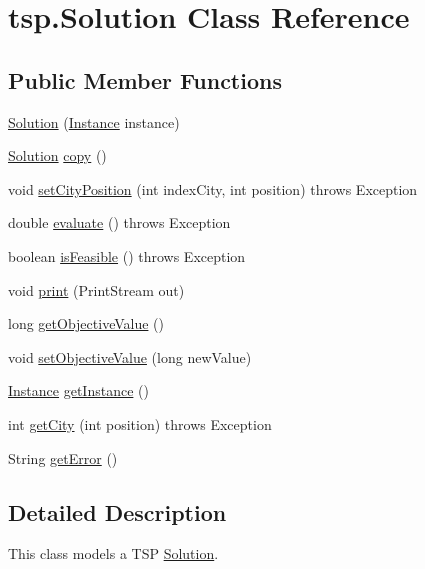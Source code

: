 \hypertarget{classtsp_1_1_solution}{}\section{tsp.\+Solution Class Reference}
\label{classtsp_1_1_solution}
\subsection*{Public Member Functions}
\begin{DoxyCompactItemize}
\item 
\mbox{\hyperlink{classtsp_1_1_solution_a1d6b0b25fa67c11755bb5f753c610fa1}{Solution}} (\mbox{\hyperlink{classtsp_1_1_instance}{Instance}} instance)
\item 
\mbox{\hyperlink{classtsp_1_1_solution}{Solution}} \mbox{\hyperlink{classtsp_1_1_solution_a8d9f2e3624443e569000155e3795bba9}{copy}} ()
\item 
void \mbox{\hyperlink{classtsp_1_1_solution_ac412146a40e865c6f0b2b8e44e4ba5e2}{set\+City\+Position}} (int index\+City, int position)  throws Exception 
\item 
double \mbox{\hyperlink{classtsp_1_1_solution_aab96d9400180cc1854a1a48b848f92a4}{evaluate}} ()  throws Exception 
\item 
boolean \mbox{\hyperlink{classtsp_1_1_solution_a93a7045acd93ccac25da9c471618f9bc}{is\+Feasible}} ()  throws Exception 
\item 
void \mbox{\hyperlink{classtsp_1_1_solution_ad51fdef9006419915ba1485d268bc307}{print}} (Print\+Stream out)
\item 
long \mbox{\hyperlink{classtsp_1_1_solution_ab6cbf5af2427f51dc8cad69cb4c7b0f5}{get\+Objective\+Value}} ()
\item 
void \mbox{\hyperlink{classtsp_1_1_solution_a5cff3a62643a336a021da631afd9f9cb}{set\+Objective\+Value}} (long new\+Value)
\item 
\mbox{\hyperlink{classtsp_1_1_instance}{Instance}} \mbox{\hyperlink{classtsp_1_1_solution_adfcfa57062ec8aaba3b71de852788bb1}{get\+Instance}} ()
\item 
int \mbox{\hyperlink{classtsp_1_1_solution_a591955a31b69922e07c98958ab129f90}{get\+City}} (int position)  throws Exception 
\item 
String \mbox{\hyperlink{classtsp_1_1_solution_acd7f1ed6324f49a3b539905cd15c34bf}{get\+Error}} ()
\end{DoxyCompactItemize}


\subsection{Detailed Description}
This class models a T\+SP \mbox{\hyperlink{classtsp_1_1_solution}{Solution}}.

